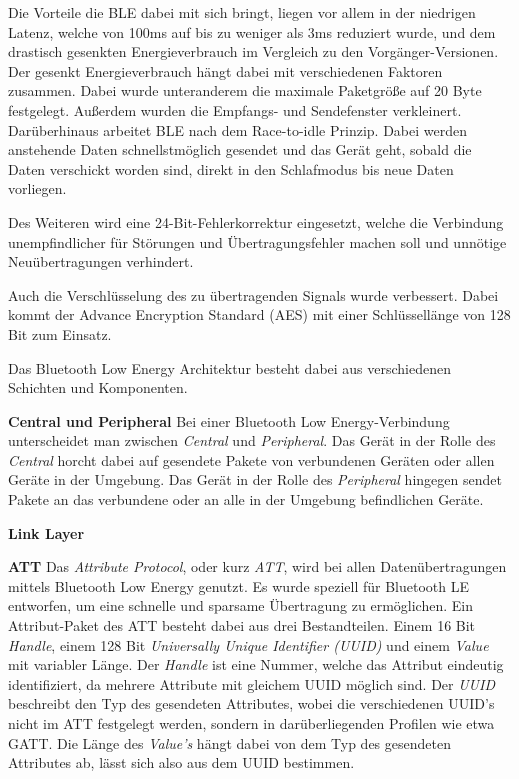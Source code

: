 Die Vorteile die BLE dabei mit sich bringt, liegen vor allem in der niedrigen Latenz, welche von 100ms auf bis zu weniger als 3ms reduziert wurde, und dem drastisch gesenkten Energieverbrauch im Vergleich zu den Vorgänger-Versionen. Der gesenkt Energieverbrauch hängt dabei mit verschiedenen Faktoren zusammen. 
Dabei wurde unteranderem die maximale Paketgröße auf 20 Byte festgelegt. Außerdem wurden die Empfangs- und Sendefenster verkleinert. 
Darüberhinaus arbeitet BLE nach dem Race-to-idle Prinzip. Dabei werden anstehende Daten schnellstmöglich gesendet und das Gerät geht, sobald die Daten verschickt worden sind, direkt in den Schlafmodus bis neue Daten vorliegen.

Des Weiteren wird eine 24-Bit-Fehlerkorrektur eingesetzt, welche die Verbindung unempfindlicher für Störungen und Übertragungsfehler machen soll und unnötige Neuübertragungen verhindert.

Auch die Verschlüsselung des zu übertragenden Signals wurde verbessert. Dabei kommt der Advance Encryption Standard (AES) mit einer Schlüssellänge von 128 Bit zum Einsatz.

Das Bluetooth Low Energy Architektur besteht dabei aus verschiedenen Schichten und Komponenten.

\textbf{Central und Peripheral}
Bei einer Bluetooth Low Energy-Verbindung unterscheidet man zwischen \emph{Central} und \emph{Peripheral}. Das Gerät in der Rolle des \emph{Central} horcht dabei auf gesendete Pakete von verbundenen Geräten oder allen Geräte in der Umgebung. Das Gerät in der Rolle des \emph{Peripheral} hingegen sendet Pakete an das verbundene oder an alle in der Umgebung befindlichen Geräte. 

\textbf{Link Layer}

\textbf{ATT}
Das \emph{Attribute Protocol}, oder kurz \emph{ATT}, wird bei allen Datenübertragungen mittels Bluetooth Low Energy genutzt. Es wurde speziell für Bluetooth LE entworfen, um eine schnelle und sparsame Übertragung zu ermöglichen. 
Ein Attribut-Paket des ATT besteht dabei aus drei Bestandteilen. Einem 16 Bit \emph{Handle}, einem 128 Bit \emph{Universally Unique Identifier (UUID)} und einem \emph{Value} mit variabler Länge.
Der \emph{Handle} ist eine Nummer, welche das Attribut eindeutig identifiziert, da mehrere Attribute mit gleichem UUID möglich sind.
Der \emph{UUID} beschreibt den Typ des gesendeten Attributes, wobei die verschiedenen UUID's nicht im ATT festgelegt werden, sondern in darüberliegenden Profilen wie etwa GATT.
Die Länge des \emph{Value's} hängt dabei von dem Typ des gesendeten Attributes ab, lässt sich also aus dem UUID bestimmen.

